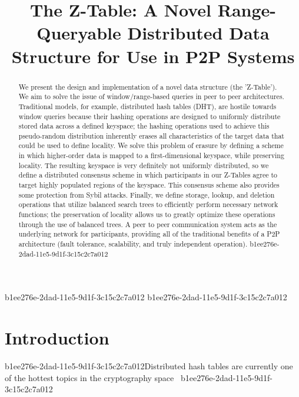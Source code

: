 \documentclass[12pt]{article}
\title{The Z-Table: A Novel Range-Queryable Distributed Data Structure for Use in P2P Systems}
\begin{document}
\maketitle

\begin{abstract}
We present the design and implementation of a novel data structure (the 'Z-Table'). We aim to solve the issue of window/range-based queries in peer to peer architectures. Traditional models, for example,  distributed hash tables (DHT), are hostile towards window queries because their hashing operations are designed to uniformly distribute stored data across a defined keyspace; the hashing operations used to achieve this pseudo-random distribution inherently erases all characteristics of the target data that could be used to define locality. We solve this problem of erasure by defining a scheme in which higher-order data is mapped to a first-dimensional keyspace, while preserving locality. The resulting keyspace is very definitely not uniformly distributed, so we define a distributed consensus scheme in which participants in our Z-Tables agree to target highly populated regions of the keyspace. This consensus scheme also provides some protection from Sybil attacks. Finally, we define storage, lookup, and deletion operations that utilize balanced search trees to efficiently perform necessary network functions; the preservation of locality allows us to greatly optimize these operations through the use of balanced trees. A peer to peer communication system acts as the underlying network for participants, providing all of the traditional benefits of a P2P architecture (fault tolerance, scalability, and truly independent operation).
b1ee276e-2dad-11e5-9d1f-3c15c2c7a012\end{abstract}

b1ee276e-2dad-11e5-9d1f-3c15c2c7a012
b1ee276e-2dad-11e5-9d1f-3c15c2c7a012\newpage
\section{Introduction}
b1ee276e-2dad-11e5-9d1f-3c15c2c7a012Distributed hash tables are currently one of the hottest topics in the cryptography space~\cite{Stoica:2001dj,Rowstron:2001ea,Ratnasamy:2001wn}
b1ee276e-2dad-11e5-9d1f-3c15c2c7a012
\printbibliography
\end{document}
